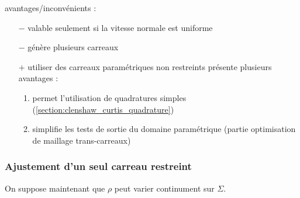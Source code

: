 




avantages/inconvénients :
\begin{itemize}
	\item[$-$] valable seulement si la vitesse normale est uniforme
	\item[$-$] génère plusieurs carreaux
	\item[$+$] utiliser des carreaux paramétriques non restreints présente plusieurs avantages :
	\begin{enumerate}
		\item permet l'utilisation de quadratures simples (\cf \autoref{section:clenshaw_curtis_quadrature})
		\item simplifie les tests de sortie du domaine paramétrique (\cf partie optimisation de maillage trans-carreaux)
	\end{enumerate}
\end{itemize}


\subsubsection{Ajustement d'un seul carreau restreint}%
\label{section:ajustement_carreau_spherique}
\def\s{\vit{s}}
On suppose maintenant que $\rho$ peut varier continument sur $\Sigma$. 

